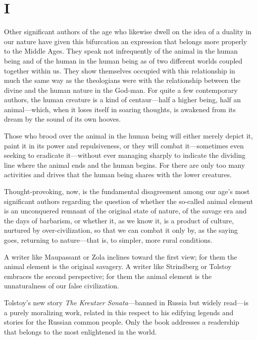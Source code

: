 \documentclass[12pt,a4paper]{article}
\begin{document}
\section*{I}

Other significant authors of the age who likewise dwell on the idea
of a duality in our nature have given this bifurcation an expression
that belongs more properly to the Middle Ages. They speak not
infrequently of the animal in the human being and of the human in the
human being as of two different worlds coupled together within us.
They show themselves occupied with this relationship in much the same
way as the theologians were with the relationship between the divine
and the human nature in the God-man. For quite a few contemporary
authors, the human creature is a kind of centaur---half a higher
being, half an animal---which, when it loses itself in soaring
thoughts, is awakened from its dream by the sound of its own hooves.

Those who brood over the animal in the human being will either merely
depict it, paint it in its power and repulsiveness, or they will
combat it---sometimes even seeking to eradicate it---without ever
managing sharply to indicate the dividing line where the animal ends
and the human begins. For there are only too many activities and
drives that the human being shares with the lower creatures.

Thought-provoking, now, is the fundamental disagreement among our
age's most significant authors regarding the question of whether the
so-called animal element is an unconquered remnant of the original
state of nature, of the savage era and the days of barbarism, or
whether it, as we know it, is a product of culture, nurtured by
over-civilization, so that we can combat it only by, as the saying
goes, returning to nature---that is, to simpler, more rural
conditions.

A writer like Maupassant or Zola inclines toward the first view; for
them the animal element is the original savagery. A writer like
Strindberg or Tolstoy embraces the second perspective; for them the
animal element is the unnaturalness of our false civilization.

Tolstoy's new story \textit{The Kreutzer Sonata}---banned in Russia
but widely read---is a purely moralizing work, related in this respect
to his edifying legends and stories for the Russian common people. Only
the book addresses a readership that belongs to the most enlightened
in the world.
\end{document}
